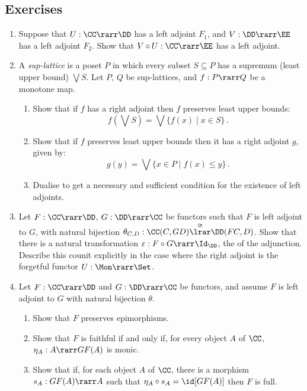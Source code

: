 \documentclass{svmult}
\begin{document}
\subsection{Exercises}
\begin{enumerate}\renewcommand{\theenumi}{\textbf{\arabic{enumi}}}
  \item Suppose that $U:\CC\rarr\DD$ has a left adjoint $F_{1}$, and $V:\DD\rarr\EE$ has a left adjoint $F_{2}$. Show that
    $V\circ U:\CC\rarr \EE$ has a left adjoint.
  \item A \emph{sup-lattice} is a poset $P$ in which every subset $S \subseteq P$ has a supremum (least upper bound) $\bigvee S$.
  Let $P$, $Q$ be sup-lattices, and $f : P \rarr Q$ be a monotone map.
    \begin{enumerate}
    \item Show that if $f$ has a right adjoint then $f$ preserves least upper bounds:
    \[ f(\bigvee S) = \bigvee \{ f(x) \mid x \in S \}\,. \]
    \item Show that if $f$ preserves least upper bounds then it has a right adjoint $g$, given by:
    \[ g(y) = \bigvee \{ x \in P \mid f(x) \leq y \}\,. \]
    \item Dualise to get a necessary and sufficient condition for the existence of left adjoints.
    \end{enumerate}
  \item Let $F : \CC \rarr \DD$, $G : \DD \rarr \CC$ be functors such that $F$ is left adjoint to $G$, with natural bijection
    $\theta_{C,D}:\CC(C,GD)\overset{\cong}{\lrar}\DD(FC,D)$.
    Show that there is a natural transformation $\varepsilon : F \circ G \rarr \Id_{\DD}$, the  of the adjunction.
    \\
    Describe this counit explicitly in the case where the right adjoint is the forgetful functor $U : \Mon \rarr \Set$.
  \item Let $F:\CC\rarr\DD$ and $G:\DD\rarr\CC$ be functors, and assume $F$ is left adjoint to $G$ with natural bijection $\theta$.
    \begin{enumerate}
      \item Show that $F$ preserves epimorphisms.
      \item Show that $F$ is faithful if and only if, for every object $A$ of $\CC$, $\eta_{A}:A\rarr GF(A)$ is monic.
      \item Show that if, for each object $A$ of $\CC$, there is a morphism $s_{A}:GF(A)\rarr A$ such that
      $\eta_{A} \circ s_{A} = \id[GF(A)]$ then $F$ is full.
    \end{enumerate}
\end{enumerate}
\end{document}
